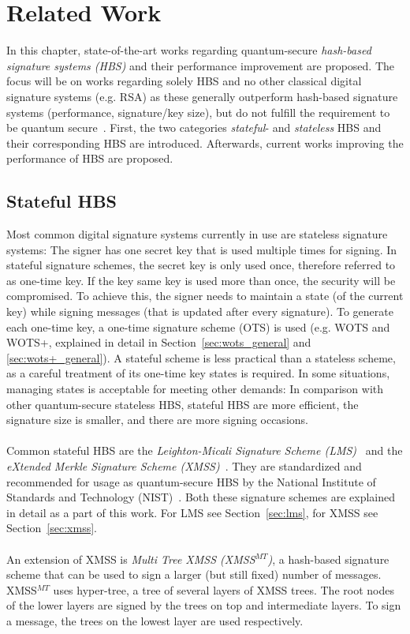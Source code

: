 \chapter{Related Work}
\label{cha:stateOfTheArt}

In this chapter, state-of-the-art works regarding quantum-secure \textit{hash-based signature systems (HBS)} and their performance improvement are proposed. 
The focus will be on works regarding solely HBS and no other classical digital signature systems (e.g. RSA) as these generally outperform hash-based signature systems (performance, signature/key size), but do not fulfill the requirement to be quantum secure~\cite{RSA_pq-attack_examples_2018,comparison_performance_RSA_ECDSA_Merkle_WOTS_2021}.
First, the two categories \textit{stateful}- and \textit{stateless} HBS and their corresponding HBS are introduced. Afterwards, current works improving the performance of HBS are proposed.

\section{Stateful HBS}
Most common digital signature systems currently in use are stateless signature systems: 
The signer has one secret key that is used multiple times for signing. In stateful signature schemes, the secret key is only used once, therefore referred to as one-time key. 
If the key same key is used more than once, the security will be compromised. 
To achieve this, the signer needs to maintain a state (of the current key) while signing messages (that is updated after every signature). To generate each one-time key, a one-time signature scheme (OTS) is used (e.g. WOTS and WOTS+, explained in detail in Section~\ref{sec:wots_general} and \ref{sec:wots+_general}).
A stateful scheme is less practical than a stateless scheme, as a careful treatment of its one-time key states is required. 
In some situations, managing states is acceptable for meeting other demands: In comparison with other quantum-secure stateless HBS, stateful HBS are more efficient, the signature size is smaller, and there are more signing occasions.~\cite{properties_stateless_HBS_2022}
\\ \\
Common stateful HBS are the \textit{Leighton-Micali Signature Scheme (LMS)}~\cite{LMS_RFC8554} and the \textit{eXtended Merkle Signature Scheme (XMSS)}~\cite{xmss_RFC8391}. They are standardized and recommended for usage as quantum-secure HBS by the National Institute of Standards and Technology (NIST)~\cite{stateful_hashbased_sign_schemes_NIST_2020}. Both these signature schemes are explained in detail as a part of this work. For LMS see Section~\ref{sec:lms}, for XMSS see Section~\ref{sec:xmss}.
\\ \\
An extension of XMSS is \textit{Multi Tree XMSS (XMSS$^{MT}$)}, a hash-based
signature scheme that can be used to sign a larger (but still fixed) number of messages.
XMSS$^{MT}$ uses hyper-tree, a tree of several layers of XMSS trees. The root nodes of the lower layers are signed by the trees on top and intermediate layers. To sign a message, the trees on the lowest layer are used respectively.~\cite{xmss_multitree_2013,xmss_RFC8391}

